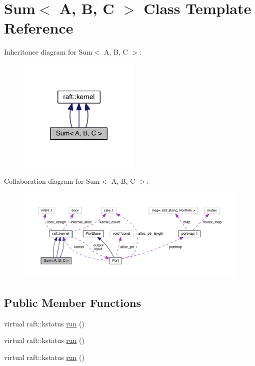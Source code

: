 \hypertarget{class_sum}{}\section{Sum$<$ A, B, C $>$ Class Template Reference}
\label{class_sum}


Inheritance diagram for Sum$<$ A, B, C $>$\+:
\nopagebreak
\begin{figure}[H]
\begin{center}
\leavevmode
\includegraphics[width=165pt]{class_sum__inherit__graph}
\end{center}
\end{figure}


Collaboration diagram for Sum$<$ A, B, C $>$\+:
\nopagebreak
\begin{figure}[H]
\begin{center}
\leavevmode
\includegraphics[width=350pt]{class_sum__coll__graph}
\end{center}
\end{figure}
\subsection*{Public Member Functions}
\begin{DoxyCompactItemize}
\item 
virtual raft\+::kstatus \hyperlink{class_sum_ab915892675d11a8f3f0de2e7f96b0d28}{run} ()
\item 
virtual raft\+::kstatus \hyperlink{class_sum_ab915892675d11a8f3f0de2e7f96b0d28}{run} ()
\item 
virtual raft\+::kstatus \hyperlink{class_sum_ab915892675d11a8f3f0de2e7f96b0d28}{run} ()
\end{DoxyCompactItemize}
